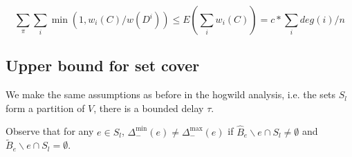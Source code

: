 
\[
\sum_\pi \sum_i \min(1, w_i(C) / w(D^i)) \leq  E( \sum_i w_i(C))  =  c* \sum_i deg(i) / n
\]


\subsection{Upper bound for set cover}

We make the same assumptions as before in the hogwild analysis, i.e. the sets $S_l$ form a partition of $V$, there is a bounded delay $\tau$.


Observe that for any $e\in S_l$, $\Delta_-^{\min}(e) \neq \Delta_-^{\max}(e)$ if $\hat{B}_e\backslash e \cap S_l \neq\emptyset$ and $\tilde{B}_e\backslash e \cap S_l = \emptyset$.

